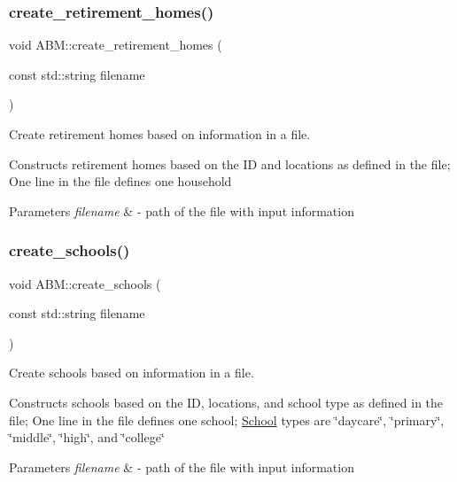 \subsubsection{\texorpdfstring{create\+\_\+retirement\+\_\+homes()}{create\_retirement\_homes()}}
{\footnotesize\ttfamily void A\+B\+M\+::create\+\_\+retirement\+\_\+homes (\begin{DoxyParamCaption}\item[{const std\+::string}]{filename }\end{DoxyParamCaption})}



Create retirement homes based on information in a file. 

Constructs retirement homes based on the ID and locations as defined in the file; One line in the file defines one household


\begin{DoxyParams}{Parameters}
{\em filename} & -\/ path of the file with input information \\
\hline
\end{DoxyParams}
\mbox{\label{classABM_af980cd2052f2fb883d5873da8c004070}} 
\subsubsection{\texorpdfstring{create\+\_\+schools()}{create\_schools()}}
{\footnotesize\ttfamily void A\+B\+M\+::create\+\_\+schools (\begin{DoxyParamCaption}\item[{const std\+::string}]{filename }\end{DoxyParamCaption})}



Create schools based on information in a file. 

Constructs schools based on the ID, locations, and school type as defined in the file; One line in the file defines one school; \hyperlink{classSchool}{School} types are \char`\"{}daycare\char`\"{}, \char`\"{}primary\char`\"{}, \char`\"{}middle\char`\"{}, \char`\"{}high\char`\"{}, and \char`\"{}college\char`\"{}


\begin{DoxyParams}{Parameters}
{\em filename} & -\/ path of the file with input information \\
\hline
\end{DoxyParams}
\mbox{\label{classABM_abe3f8db8d70dbbaa40815515f4057ced}} 

